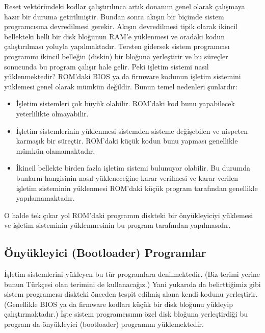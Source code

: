 \documentclass[a4paper,10pt,turkish]{sphinxmanual}
\begin{document}
\sphinxAtStartPar
Reset vektöründeki kodlar çalıştırılınca artık donanım genel olarak çalışmaya hazır bir duruma getirilmiştir.
Bundan sonra akışın bir biçimde sistem programcısına devredilmesi gerekir. Akışın devredilmesi tipik olarak
ikincil bellekteki belli bir disk bloğunun RAM’e yüklenmesi ve oradaki kodun çalıştırılması yoluyla yapılmaktadır.
Tersten gidersek sistem programcısı programını ikincil belleğin (diskin) bir bloğuna yerleştirir ve bu süreçler
sonucunda bu program çalışır hale gelir. Peki işletim sistemi nasıl yüklenmektedir? ROM’daki BIOS ya da firmware
kodunun işletim sistemini yüklemesi genel olarak mümkün değildir. Bunun temel nedenleri şunlardır:
\begin{itemize}
\item {} 
\sphinxAtStartPar
İşletim sistemleri çok büyük olabilir. ROM’daki kod bunu yapabilecek yeterlilikte olmayabilir.

\item {} 
\sphinxAtStartPar
İşletim sistemlerinin yüklenmesi sistemden sisteme değişebilen ve nispeten karmaşık bir süreçtir. ROM’daki küçük
kodun bunu yapması genellikle mümkün olamamaktadır.

\item {} 
\sphinxAtStartPar
İkincil bellekte birden fazla işletim sistemi bulunuyor olabilir. Bu durumda bunların hangisinin nasıl
yükleneceğine karar verilmesi ve karar verilen işletim sisteminin yüklenmesi ROM’daki küçük program tarafından
genellikle yapılamamaktadır.

\end{itemize}

\sphinxAtStartPar
O halde tek çıkar yol ROM’daki programın diskteki bir önyükleyiciyi yüklemesi ve işletim sisteminin yüklenmesinin
bu program tarafından yapılmasıdır.


\subsection{Önyükleyici (Bootloader) Programlar}
\label{\detokenize{introduction:onyukleyici-bootloader-programlar}}
\sphinxAtStartPar
İşletim sistemlerini yükleyen bu tür programlara  denilmektedir. (Biz 
terimi yerine bunun Türkçesi olan  terimini de kullanacağız.) Yani yukarıda da belirttiğimiz gibi
sistem programcısı diskteki önceden tespit edilmiş alana kendi kodunu yerleştirir. (Genellikle BIOS ya da firmware
kodları küçük bir disk bloğunu yükleyip çalıştırmaktadır.) İşte sistem programcısının özel disk bloğuna
yerleştirdiği bu program da önyükleyici (bootloader) programını yüklemektedir.
\end{document}
